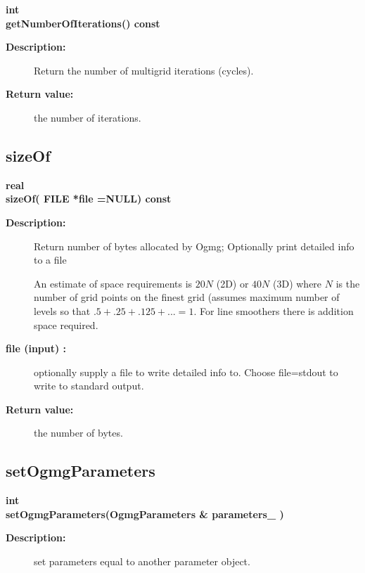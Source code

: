 \begin{flushleft} \textbf{%
int  \\ 
\settowidth{\OgmgIncludeArgIndent}{getNumberOfIterations(}%
getNumberOfIterations() const
}\end{flushleft}
\begin{description}
\item[{\bf Description:}]  
   Return the number of multigrid iterations (cycles).
\item[{\bf Return value:}]  the number of iterations.
\end{description}
\subsection{sizeOf}
 
\begin{flushleft} \textbf{%
real   \\ 
\settowidth{\OgmgIncludeArgIndent}{sizeOf(}%
sizeOf( FILE *file  =NULL) const 
}\end{flushleft}
\begin{description}
\item[{\bf Description:}]  
   Return number of bytes allocated by Ogmg; Optionally print detailed info to a file

 An estimate of space requirements is  $20N$ (2D) or $40N$ (3D) where $N$ is the number of
  grid points on the finest grid (assumes maximum number of levels so that $.5+.25+.125+...=1$.
 For line smoothers there is addition space required.

\item[{\bf file (input) :}]  optionally supply a file to write detailed info to. Choose file=stdout to
 write to standard output.
\item[{\bf Return value:}]  the number of bytes.
\end{description}
\subsection{setOgmgParameters}
 
\begin{flushleft} \textbf{%
int   \\ 
\settowidth{\OgmgIncludeArgIndent}{setOgmgParameters(}%
setOgmgParameters(OgmgParameters \& parameters\_ )
}\end{flushleft}
\begin{description}
\item[{\bf Description:}] 
 set parameters equal to another parameter object.

\end{description}

